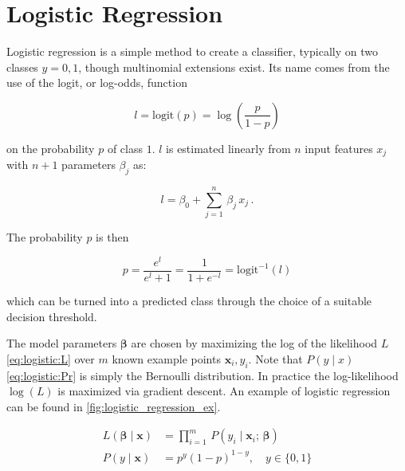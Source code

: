 \section{Logistic Regression}
\label{regression:logistic}

Logistic regression is a simple method to create a classifier,
typically on two classes $y = 0,1$, though multinomial extensions exist.
Its name comes from the use of the logit, or log-odds, function

\begin{equation}\label{eq:logistic:logic}
l = \text{logit}\left(p\right) = \log\left(\frac{p}{1-p}\right)
\end{equation}

\noindent on the probability $p$ of class $1$.
$l$ is estimated linearly from $n$ input features $x_{j}$ with $n+1$ parameters $\beta_{j}$ as:

\begin{equation}\label{eq:logistic:logicBeta}
l = \beta_{0} + \sum_{j=1}^{n} \, \beta_{j}\,x_{j}\,.
\end{equation}

\noindent The probability $p$ is then

\begin{equation}\label{eq:logistic:p}
p = \frac{e^l}{e^l + 1} = \frac{1}{1+e^{-l}} = \text{logit}^{-1}\left(l\right)
\end{equation}

\noindent which can be turned into a predicted class through the choice of a suitable decision threshold.

The model parameters $\bm{\beta}$ are chosen by maximizing
the log of the likelihood $L$ \cref{eq:logistic:L} over $m$ known example points $\mathbf{x}_{i}, y_{i}$.
Note that $P\left(y \mid x\right)$ \cref{eq:logistic:Pr} is simply the Bernoulli distribution.
In practice the log-likelihood $\log\left(L\right)$ is maximized via gradient descent.
An example of logistic regression can be found in \cref{fig:logistic_regression_ex}.

\begin{subequations} \label{eq:logistic:L_Pr}
\begin{align}
L\left(\bm{\beta} \mid \mathbf{x}\right) &= \prod_{i=1}^{m} \, P\left(y_{i} \mid \mathbf{x}_{i};\,\bm{\beta}\right) \label{eq:logistic:L} \\
P\left(y \mid \mathbf{x}\right) &= p^y\left(1-p\right)^{1-y}, \quad y \in \{0, 1\} \label{eq:logistic:Pr}
\end{align}
\end{subequations}

